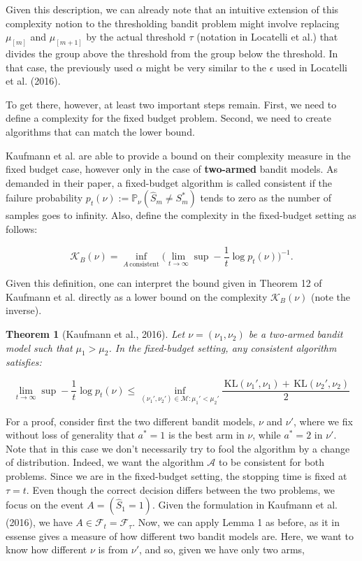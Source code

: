 \documentclass[12pt,]{article}
\newtheorem{theorem}{Theorem}
\newcommand{\KL}{\,\text{KL}}
\begin{document}
Given this description, we can already note that an intuitive extension
of this complexity notion to the thresholding bandit problem might
involve replacing \(\mu_{[m]}\) and \(\mu_{[m+1]}\) by the actual
threshold \(\tau\) (notation in Locatelli et al.) that divides the group
above the threshold from the group below the threshold. In that case,
the previously used \(\alpha\) might be very similar to the \(\epsilon\)
used in Locatelli et al. (2016).

To get there, however, at least two important steps remain. First, we
need to define a complexity for the fixed budget problem. Second, we
need to create algorithms that can match the lower bound.

Kaufmann et al. are able to provide a bound on their complexity measure
in the fixed budget case, however only in the case of \textbf{two-armed}
bandit models. As demanded in their paper, a fixed-budget algorithm is
called consistent if the failure probability
\(p_t(\nu) := \mathbb{P}_{\nu}(\hat{S}_m \neq S^*_m)\) tends to zero as
the number of samples goes to infinity. Also, define the complexity in
the fixed-budget setting as follows:

\begin{equation}
\mathcal{K}_B(\nu) = \inf_{A \, \text{consistent}} \big(\lim_{t \to \infty} \sup - \frac{1}{t} \log p_t(\nu)\big)^{-1}.
\end{equation}

Given this definition, one can interpret the bound given in Theorem 12
of Kaufmann et al. directly as a lower bound on the complexity
\(\mathcal{K}_B(\nu)\) (note the inverse).

\begin{theorem}[Kaufmann et al., 2016] \label{theorem:KaufmannEtAlTheorem12}
Let $\nu = (\nu_1, \nu_2)$ be a two-armed bandit model such that $\mu_1 > \mu_2$. In the fixed-budget setting, any consistent algorithm satisfies:

\begin{equation*}
\lim_{t \to \infty} \sup - \frac{1}{t} \log p_t(\nu) \leq \inf_{(\nu_1', \nu_2') \in \mathcal{M}: \mu_1' < \mu_2'} \frac{\KL(\nu_1', \nu_1) + \KL(\nu_2', \nu_2)}{2}
\end{equation*}
\end{theorem}

For a proof, consider first the two different bandit models, \(\nu\) and
\(\nu'\), where we fix without loss of generality that \(a^* = 1\) is
the best arm in \(\nu\), while \(a^* = 2\) in \(\nu'\). Note that in
this case we don't necessarily try to fool the algorithm by a change of
distribution. Indeed, we want the algorithm \(\mathcal{A}\) to be
consistent for both problems. Since we are in the fixed-budget setting,
the stopping time is fixed at \(\tau = t\). Even though the correct
decision differs between the two problems, we focus on the event
\(A = (\hat{S}_1 = 1)\). Given the formulation in Kaufmann et al.
(2016), we have \(A \in \mathcal{F}_t = \mathcal{F}_{\tau}\). Now, we
can apply Lemma 1 as before, as it in essense gives a measure of how
different two bandit models are. Here, we want to know how different
\(\nu\) is from \(\nu'\), and so, given we have only two arms,
\end{document}
